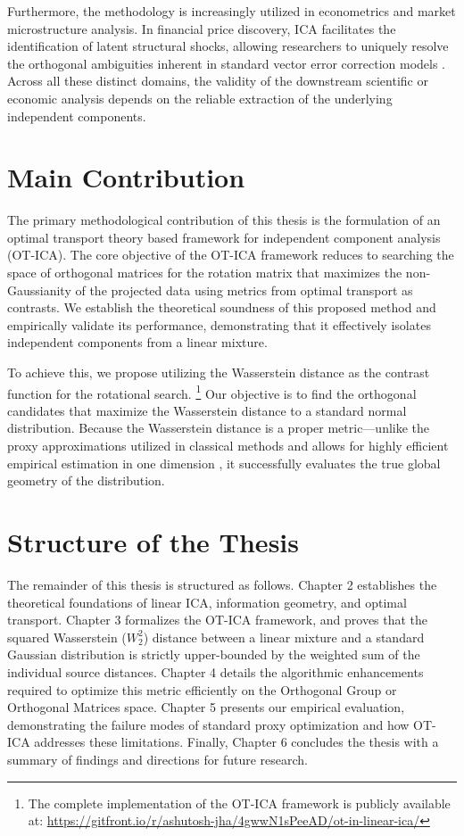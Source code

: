 \documentclass[12pt,a4paper,twoside,openany]{book}
\begin{document}
Furthermore, the methodology is increasingly utilized in econometrics and market microstructure analysis. 
In financial price discovery, ICA facilitates the identification of latent structural shocks, allowing researchers to 
uniquely resolve the orthogonal ambiguities inherent in standard vector error correction models \cite{zema2025}. 
Across all these distinct domains, the validity of the downstream scientific or economic analysis depends on the 
reliable extraction of the underlying independent components.

\section{Main Contribution}

The primary methodological contribution of this thesis is the formulation of an optimal transport theory based framework for 
independent component analysis (OT-ICA). 
The core objective of the OT-ICA framework reduces to searching the space of orthogonal matrices for the rotation matrix 
that maximizes the non-Gaussianity of the projected data using metrics from optimal transport as contrasts. 
We establish the theoretical soundness of this proposed method and empirically validate its performance, 
demonstrating that it effectively isolates independent components from a linear mixture.

To achieve this, we propose utilizing the Wasserstein distance \cite{villani2003} as the contrast function for the rotational search.
\footnote{The complete implementation of the OT-ICA framework is publicly available at: \url{https://gitfront.io/r/ashutosh-jha/4gwwN1sPeeAD/ot-in-linear-ica/}} 
Our objective is to find the orthogonal candidates that maximize the Wasserstein distance to a standard normal distribution. 
Because the Wasserstein distance is a proper metric---unlike the proxy approximations utilized in classical methods 
and allows for highly efficient empirical estimation in one dimension \cite{villani2003}, it successfully evaluates 
the true global geometry of the distribution.

\section{Structure of the Thesis}

The remainder of this thesis is structured as follows. Chapter 2 establishes the theoretical foundations of linear ICA, information geometry, 
and optimal transport. Chapter 3 formalizes the OT-ICA framework, and proves that the squared Wasserstein ($W_2^2$) distance 
between a linear mixture and a standard Gaussian distribution is strictly upper-bounded by the weighted sum of the individual source distances. 
Chapter 4 details the algorithmic enhancements required to optimize this metric efficiently on the Orthogonal Group or Orthogonal Matrices space. 
Chapter 5 presents our empirical evaluation, demonstrating the failure modes of standard proxy optimization and how OT-ICA addresses these limitations. 
Finally, Chapter 6 concludes the thesis with a summary of findings and directions for future research.
\end{document}
